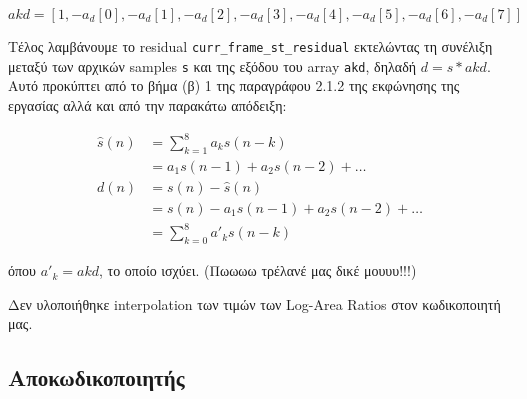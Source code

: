 \documentclass{article}
\begin{document}
\begin{equation}
    akd = \left[1, -a_d[0], -a_d[1], -a_d[2], -a_d[3], -a_d[4], -a_d[5], -a_d[6], -a_d[7]\right]
\end{equation}

Τέλος λαμβάνουμε το residual \verb|curr_frame_st_residual| εκτελώντας τη συνέλιξη 
μεταξύ των αρχικών samples \verb|s| και της εξόδου του array \verb|akd|, 
δηλαδή $d = s \ast akd$. Αυτό προκύπτει από το βήμα (β) 1 της παραγράφου 
2.1.2 της εκφώνησης της εργασίας αλλά και από την παρακάτω απόδειξη:

\begin{align}
    \hat{s}(n) &= \sum_{k=1}^8 a_ks(n-k) \\
                   &= a_1 s(n - 1) + a_2 s(n - 2) + \ldots \\
              d(n) &= s(n) - \hat{s}(n) \\
                   &= s(n) - a_1 s(n - 1) + a_2 s(n - 2)+ \ldots \\
                   &= \sum_{k=0}^8 a'_ks(n-k)
\end{align}

όπου $a'_k = akd$, το οποίο ισχύει. (Πωωωω τρέλανέ μας δικέ μουυυ!!!)

Δεν υλοποιήθηκε interpolation των τιμών των Log-Area Ratios στον κωδικοποιητή μας.

\subsection{Αποκωδικοποιητής}
\end{document}
